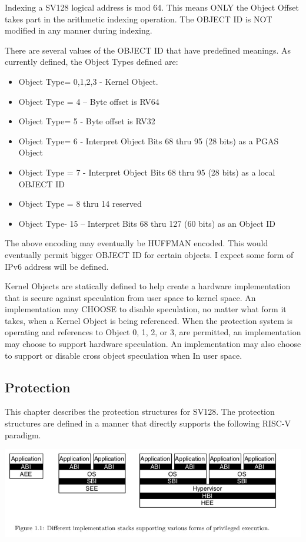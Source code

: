 \documentclass{article}
\begin{document}
Indexing a SV128 logical address is mod 64.  This means ONLY the Object Offset takes part in the arithmetic indexing operation.  The OBJECT ID is NOT modified in any manner during indexing.

There are several values of the OBJECT ID that have predefined meanings.  As currently defined,  the Object Types defined are: 


\begin{itemize}
\item Object  Type= 0,1,2,3 -  Kernel Object.
\item   Object  Type = 4 – Byte offset is RV64
\item   Object  Type=  5 -  Byte offset is RV32
\item   Object   Type= 6 -   Interpret Object Bits 68 thru 95 (28 bits) as a PGAS Object
\item   Object Type = 7 -    Interpret Object Bits 68 thru 95 (28 bits) as a local OBJECT ID
\item   Object  Type = 8 thru 14 reserved
\item  Object  Type- 15 – Interpret Bits 68 thru 127 (60 bits) as an Object ID

\end{itemize}

The above encoding may eventually be HUFFMAN encoded.  This would eventually permit bigger OBJECT ID for certain objects.  I expect some form of IPv6 address will be defined.

Kernel Objects are statically defined to help create a hardware implementation that is secure against speculation from user space to kernel space.  An implementation may CHOOSE to disable speculation, no matter what form it takes,  when a Kernel Object is  being referenced.  When the protection system is operating  and references to  Object 0, 1, 2, or 3,  are permitted,  an implementation may choose to support hardware speculation.  An implementation may also choose to support or disable cross object speculation when In user space.

\subsection{Protection}

This chapter describes the protection structures  for SV128.  The protection structures are defined in a manner that directly supports the following RISC-V paradigm.

\begin{center}
\includegraphics[scale = .4]
{figures/figure1c_riscv_stacks.jpg}
\centering
\end{center}
\end{document}
